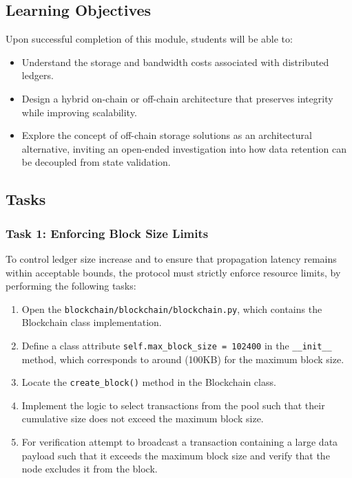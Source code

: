 \subsection{Learning Objectives}
Upon successful completion of this module, students will be able to:
\begin{itemize}
    \item Understand the storage and bandwidth costs associated with distributed ledgers.
    \item Design a hybrid on-chain or off-chain architecture that preserves integrity while improving scalability.
    \item Explore the concept of off-chain storage solutions as an architectural alternative, inviting an open-ended investigation into how data retention can be decoupled from state validation.
\end{itemize}

\newpage
\subsection{Tasks}

\subsubsection*{Task 1: Enforcing Block Size Limits}
To control ledger size increase and to ensure that propagation latency remains within acceptable bounds, the protocol must strictly enforce resource limits, by performing the following tasks:
\begin{enumerate}
    \item Open the \texttt{blockchain/blockchain/blockchain.py}, which contains the Blockchain class implementation.
    \item Define a class attribute \texttt{self.max\_block\_size = 102400} in the \texttt{\_\_init\_\_} method, which corresponds to around (100KB) for the maximum block size.
    \item Locate the \texttt{create\_block()} method in the Blockchain class.
    \item Implement the logic to select transactions from the pool such that their cumulative size does not exceed the maximum block size.
    \item For verification attempt to broadcast a transaction containing a large data payload such that it exceeds the maximum block size and verify that the node excludes it from the block.
\end{enumerate}

